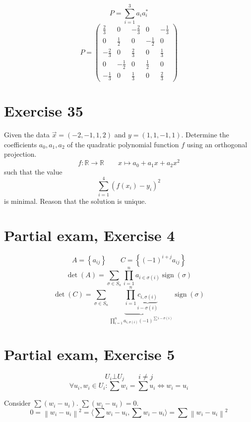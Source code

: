 \documentclass[a4paper]{article}
\theoremstyle{definition}
\newcommand\set[1]{\left\{#1\right\}}
\newcommand\ip[2]{\langle{#1},{#2}\rangle}
\newcommand\norm[1]{\left\|{#1}\right\|}
\begin{document}
\[ P = \sum_{i=1}^3 a_i a_i^* \]
\[
  P = \begin{pmatrix}
    \frac23 & 0 & -\frac23 & 0 & -\frac13 \\
    0 & \frac12 & 0 & -\frac12 & 0 \\
    -\frac23 & 0 & \frac23 & 0 & \frac13 \\
    0 & -\frac12 & 0 & \frac12 & 0 \\
    -\frac13 & 0 &\frac13 & 0 & \frac23
  \end{pmatrix}
\]


\section{Exercise 35}
\begin{ex}
  Given the data $\vec x = (-2, -1, 1, 2)$ and $y = (1,1,-1, 1)$. Determine the coefficients $a_0, a_1, a_2$ of the quadratic polynomial function $f$ using an orthogonal projection.
  \[ f: \mathbb R \to \mathbb R \qquad x \mapsto a_0 + a_1 x + a_2 x^2 \]
  such that the value
  \[ \sum_{i=1}^4 (f(x_i) - y_i)^2 \]
  is minimal. Reason that the solution is unique.
\end{ex}

\section{Partial exam, Exercise 4}

\[ A= \set{a_{ij}} \qquad C = \set{(-1)^{i+j}a_{ij}} \]
\[ \det(A) = \sum_{\sigma \in S_n} \prod_{i=1}^n a_{i \in \sigma(i)} \operatorname{sign}(\sigma) \]
\[ \det(C) = \sum_{\sigma \in S_n} \underbrace{\prod_{i=1}^n \underbrace{c_{i,\sigma(i)}}_{i-\sigma(i)}}_{\prod_{i=1}^n a_{i,\sigma(i)} (-1)^{\sum i - \sigma(i)}} \operatorname{sign}(\sigma) \]

\section{Partial exam, Exercise 5}

\[ U_i \bot U_j \qquad i \neq j \]
\[ \forall u_i, w_i \in U_i: \sum w_i = \sum u_i \iff w_i = u_i \]

Consider $\sum (w_i - u_i)$. $\sum (w_i - u_i) = 0$.
\[ 0 = \norm{w_i - u_i}^2 = \ip{\sum w_i - u_i}{\sum w_i - u_i} = \sum \norm{w_i - u_i}^2 \]
\end{document}
